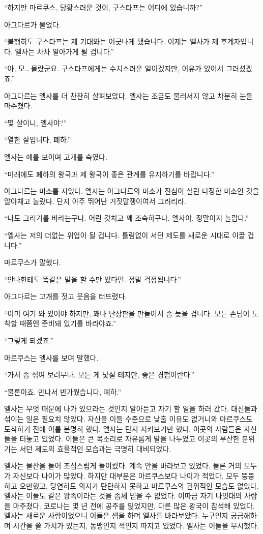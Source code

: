 ``하지만 마르쿠스, 당황스러운 것이, 구스타프는 어디에 있습니까?''

아그다르가 물었다.

``불행히도 구스타프는 제 기대와는 어긋나게 됐습니다. 이제는 엘사가 제 후계자입니다. 엘사는 차차 알아가게 될 겁니다.''

``아, 모\ldots\,몰랐군요. 구스타프에게는 수치스러운 일이겠지만, 이유가 있어서 그러셨겠죠.''

아그다르는 엘사를 더 찬찬히 살펴보았다. 엘사는 조금도 물러서지 않고 차분히 눈을 마주쳤다.

``몇 살이니, 엘사야?''

``열한 살입니다, 폐하.''

엘사는 예를 보이며 고개를 숙였다.

``미래에도 폐하의 왕국과 제 왕국이 좋은 관계를 유지하기를 바랍니다.''

아그다르는 미소를 지었다. 엘사는 아그다르의 미소가 진심이 실린 다정한 미소인 것을 알아채고 놀랐다. 단지 아주 뛰어난 거짓말쟁이여서 그러리라.

``나도 그러기를 바라는구나. 어린 것치고 꽤 조숙하구나, 엘사야. 정말이지 놀랍다.''

``엘사는 저의 더없는 위업이 될 겁니다. 틀림없이 서던 제도를 새로운 시대로 이끌 겁니다.''

마르쿠스가 말했다.

``안나한테도 똑같은 말을 할 수만 있다면. 정말 걱정됩니다.''

아그다르는 고개를 젓고 웃음을 터뜨렸다.

``이미 여기 와 있어야 하지만, 꽤나 난장판을 만들어서 좀 늦을 겁니다. 모든 손님이 도착할 때쯤엔 준비돼 있기를 바라야죠.''

``그렇게 되겠죠.''

마르쿠스는 엘사를 보며 말했다.

``가서 좀 섞여 보려무나. 모든 게 낯설 테지만, 좋은 경험이란다.''

``물론이죠. 만나서 반가웠습니다, 폐하.''

엘사는 무엇 때문에 나가 있으라는 것인지 알아듣고 자기 할 일을 하러 갔다. 대신들과 섞이는 일은 필요치 않았다. 자신을 이들 수준으로 낮출 이유도 없거니와 마르쿠스도 도착하기 전에 이를 분명히 했다. 엘사는 단지 지켜보기만 했다. 이곳의 사람들은 자신들을 터놓고 있었다. 이들은 큰 목소리로 자유롭게 말을 나누었고 이곳의 부산한 분위기는 서던 제도의 효율적인 모습과는 극명히 대비되었다.

엘사는 물잔을 들어 조심스럽게 들이켰다. 계속 안을 바라보고 있었다. 물론 거의 모두가 자신보다 나이가 많았다. 하지만 대부분은 마르쿠스보다 나이가 적었다. 모두 뚱뚱하고 오만했고, 당연히도 의지가 탄탄하지 못하고 마르쿠스의 권위적인 모습도 없었다. 엘사는 이들도 같은 왕족이라는 것을 좀체 믿을 수 없었다. 이따금 자기 나잇대의 사람을 마주쳤다. 코로나는 몇 년 전에 공주를 잃었지만, 다른 많은 왕국이 참석해 있었다. 엘사는 새로운 사람이었으니 이들은 셈을 하며 엘사를 바라보았다. 누구인지 궁금해하며 시간을 쓸 가치가 있는지, 동맹인지 적인지 따지고 있었다. 엘사는 이들을 무시했다.

